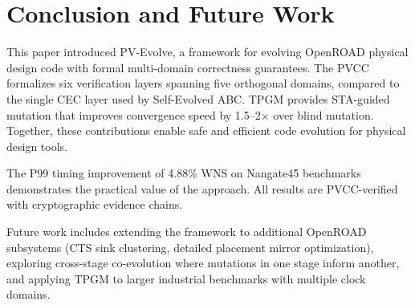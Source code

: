 \documentclass[conference]{IEEEtran}
\begin{document}
\section{Conclusion and Future Work}

This paper introduced PV-Evolve, a framework for evolving OpenROAD physical design code with formal multi-domain correctness guarantees. The PVCC formalizes six verification layers spanning five orthogonal domains, compared to the single CEC layer used by Self-Evolved ABC. TPGM provides STA-guided mutation that improves convergence speed by 1.5--2$\times$ over blind mutation. Together, these contributions enable safe and efficient code evolution for physical design tools.

The P99 timing improvement of 4.88\% WNS on Nangate45 benchmarks demonstrates the practical value of the approach. All results are PVCC-verified with cryptographic evidence chains.

Future work includes extending the framework to additional OpenROAD subsystems (CTS sink clustering, detailed placement mirror optimization), exploring cross-stage co-evolution where mutations in one stage inform another, and applying TPGM to larger industrial benchmarks with multiple clock domains.
\end{document}
